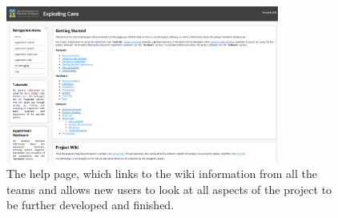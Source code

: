 \begin{figure}[H]
	\centering
	\includegraphics[width=0.8\textwidth]{figures/gui_help.png}
	\caption{The help page, which links to the wiki information from all the teams and allows new users to look at all aspects of the project to be further developed and finished. } 
\end{figure}




